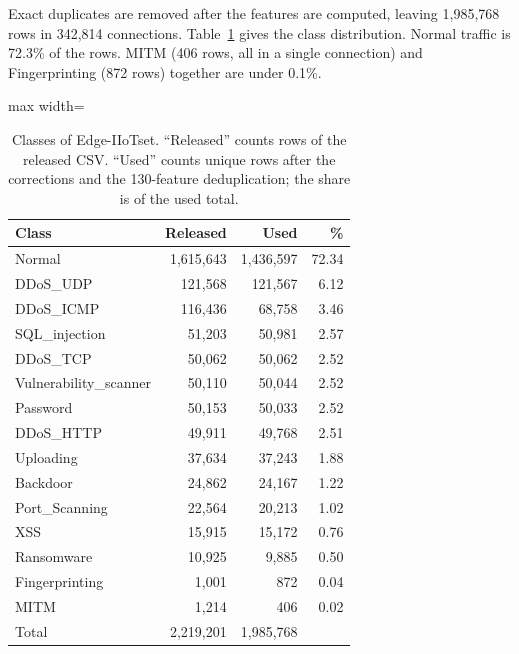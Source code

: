 Exact duplicates are removed after the features are computed, leaving 1,985,768 rows in 342,814 connections. Table~\ref{tab:classes} gives the class distribution. Normal traffic is 72.3\% of the rows. MITM (406 rows, all in a single connection) and Fingerprinting (872 rows) together are under 0.1\%.

\begin{table}[t]
\centering
\caption{Classes of Edge-IIoTset. ``Released'' counts rows of the released CSV. ``Used'' counts unique rows after the corrections and the 130-feature deduplication; the share is of the used total.}
\label{tab:classes}
\small
\begin{adjustbox}{max width=\linewidth}
\begin{tabular}{lrrr}
\toprule
Class & Released & Used & \% \\
\midrule
Normal & 1,615,643 & 1,436,597 & 72.34 \\
DDoS\_UDP & 121,568 & 121,567 & 6.12 \\
DDoS\_ICMP & 116,436 & 68,758 & 3.46 \\
SQL\_injection & 51,203 & 50,981 & 2.57 \\
DDoS\_TCP & 50,062 & 50,062 & 2.52 \\
Vulnerability\_scanner & 50,110 & 50,044 & 2.52 \\
Password & 50,153 & 50,033 & 2.52 \\
DDoS\_HTTP & 49,911 & 49,768 & 2.51 \\
Uploading & 37,634 & 37,243 & 1.88 \\
Backdoor & 24,862 & 24,167 & 1.22 \\
Port\_Scanning & 22,564 & 20,213 & 1.02 \\
XSS & 15,915 & 15,172 & 0.76 \\
Ransomware & 10,925 & 9,885 & 0.50 \\
Fingerprinting & 1,001 & 872 & 0.04 \\
MITM & 1,214 & 406 & 0.02 \\
\midrule
Total & 2,219,201 & 1,985,768 & \\
\bottomrule
\end{tabular}
\end{adjustbox}
\end{table}
